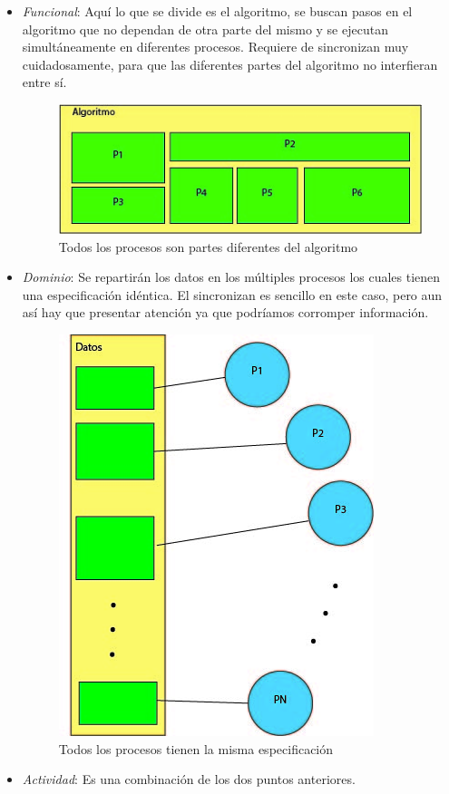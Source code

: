 \begin{itemize}
 
	\item \textit{Funcional}: Aquí lo que se divide es el algoritmo, se buscan pasos en el algoritmo que no dependan de otra parte del mismo y se ejecutan simultáneamente en diferentes procesos. Requiere de sincronizan muy cuidadosamente, para que las diferentes partes del algoritmo no interfieran entre sí. 
	
	\begin{figure}[h]
			\centering
				\includegraphics[scale=0.7]{img/funcional.jpg}
			\caption{Todos los procesos son partes diferentes del algoritmo}
	\end{figure}

	\item \textit{Dominio}: Se repartirán los datos en los múltiples procesos los cuales tienen una especificación idéntica. El sincronizan es sencillo en este caso, pero aun así hay que presentar atención ya que podríamos corromper información.
	\begin{figure}[h]
			\centering
				\includegraphics[scale=0.6]{img/dominio.jpg}
			\caption{Todos los procesos tienen la misma especificación}
	\end{figure}

	\item 	\textit{Actividad}: Es una combinación de los dos puntos anteriores.
\end{itemize}

